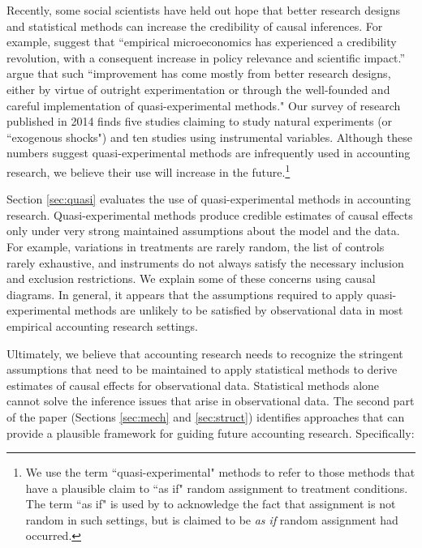 \documentclass[12pt,reqno,titlepage]{amsart}
\theoremstyle{definition}
\begin{document}
\begin{doublespace}
Recently, some social scientists have held out hope that better research designs and statistical methods can increase the credibility of causal inferences.
For example, \citet{Angrist:2010jv} suggest that ``empirical microeconomics has experienced a credibility revolution, with a consequent increase in policy relevance and scientific impact.''  
\citet[p.\,26]{Angrist:2010jv} argue that such ``improvement has come mostly from better research designs, either by virtue of outright experimentation or through the well-founded and careful implementation of quasi-experimental methods."
Our survey of research published in 2014 finds five studies claiming to study natural experiments (or ``exogenous shocks") and ten studies using instrumental variables.
Although these numbers suggest quasi-experimental methods are infrequently used in accounting research, we believe their use will increase in the future.\footnote{
We use the term ``quasi-experimental" methods to refer to those methods that have a plausible claim to ``as if" random assignment to treatment conditions.
The term ``as if" is used by \citet{Dunning:2012tt} to acknowledge the fact that assignment is not random in such settings, but is claimed to be \emph{as if} random assignment had occurred.}

Section \ref{sec:quasi} evaluates the use of quasi-experimental methods in accounting research. 
Quasi-experimental methods produce credible estimates of causal effects only under very strong maintained assumptions about the model and the data. 
For example, variations in treatments are rarely random, the list of controls rarely exhaustive, and instruments do not always satisfy the necessary inclusion and exclusion restrictions.
We explain some of these concerns using causal diagrams.
In general, it appears that the assumptions required to apply quasi-experimental methods are unlikely to be satisfied by observational data in most empirical accounting research settings.

Ultimately, we believe that accounting research needs to recognize the stringent assumptions that need to be maintained to apply statistical methods to derive estimates of causal effects for observational data.
Statistical methods alone cannot solve the inference issues that arise in observational data. 
The second part of the paper (Sections \ref{sec:mech} and \ref{sec:struct}) identifies approaches that can provide a plausible framework for guiding future accounting research. Specifically: 


\end{doublespace}
\end{document}
